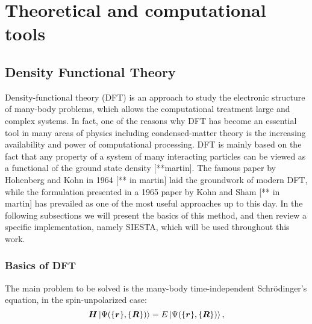 
\chapter{Theoretical and computational tools} %

\label{ch2} %


\newcommand{\keyword}[1]{\textbf{#1}}
\newcommand{\tabhead}[1]{\textbf{#1}}
\newcommand{\code}[1]{\texttt{#1}}
\newcommand{\file}[1]{\texttt{\bfseries#1}}
\newcommand{\option}[1]{\texttt{\itshape#1}}

\section{Density Functional Theory}

Density-functional theory (DFT) is an approach to study the electronic structure of many-body problems, which allows the computational treatment large and complex systems. In fact, one of the reasons why DFT has become an essential tool in many areas of physics including condensed-matter theory is the increasing availability and power of computational processing. DFT is mainly based on the fact that any property of a system of many interacting particles can be viewed as a functional of the ground state
density [**martin]. The famous paper by Hohenberg and Kohn in 1964 [** in martin] laid the groundwork of modern DFT, while the formulation presented in a 1965 paper by Kohn and Sham [** in martin] has prevailed as one of the most useful approaches up to this day. In the following subsections we will present the basics of this method, and then review a specific implementation, namely SIESTA, which will be used throughout this work.


\subsection{Basics of DFT}
The main problem to be solved is the many-body time-independent Schrödinger's equation, in the spin-unpolarized case:
\begin{equation}
\bm H \ket{\Psi(\{\bm r\},\{\bm R\})} = E \ket{\Psi(\{\bm r\},\{\bm R\})},
\end{equation}

